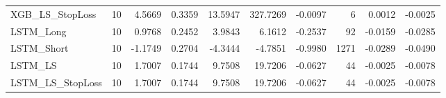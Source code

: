 \begin{tabular}{llrrrrrrrr}
\cline{1-10}
XGB\_LS\_StopLoss & 10 & 4.5669 & 0.3359 & 13.5947 & 327.7269 & -0.0097 & 6 & 0.0012 & -0.0025 \\
\cline{1-10}
LSTM\_Long & 10 & 0.9768 & 0.2452 & 3.9843 & 6.1612 & -0.2537 & 92 & -0.0159 & -0.0285 \\
\cline{1-10}
LSTM\_Short & 10 & -1.1749 & 0.2704 & -4.3444 & -4.7851 & -0.9980 & 1271 & -0.0289 & -0.0490 \\
\cline{1-10}
LSTM\_LS & 10 & 1.7007 & 0.1744 & 9.7508 & 19.7206 & -0.0627 & 44 & -0.0025 & -0.0078 \\
\cline{1-10}
LSTM\_LS\_StopLoss & 10 & 1.7007 & 0.1744 & 9.7508 & 19.7206 & -0.0627 & 44 & -0.0025 & -0.0078 \\
\cline{1-10}
\bottomrule
\end{tabular}
